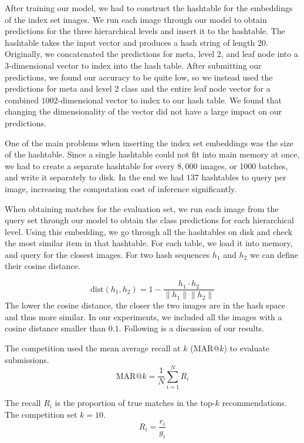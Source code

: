 \documentclass[conference]{IEEEtran}
\begin{document}
After training our model, we had to construct the hashtable for the 
embeddings of the index set images.
We run each image through our model to obtain predictions for the 
three hierarchical levels and insert it to the hashtable.
The hashtable takes the input vector and produces a hash string  of length 20.
Originally, we concatenated the predictions for meta, level 2, and leaf node
into a 3-dimensional vector to index into the hash table.
After submitting our predictions, we found our accuracy to be quite low, so we
instead used the predictions for meta and level 2 class and the entire leaf 
node vector for a combined $1002$-dimensional vector to index to our hash table.
We found that changing the dimensionality of the vector did not have a large
impact on our predictions.


One of the main problems when inserting the index set embeddings was the size of the hashtable.
Since a single hashtable could not fit into main memory at once, 
we had to create a separate hashtable for every $8,000$ images, or 1000 batches, and write 
it separately to disk.
In the end we had $137$ hashtables to query per image, increasing
the computation cost of inference significantly.


When obtaining matches for the evaluation set, we run each image from the query set through 
our model to obtain the class predictions for each hierarchical level.
Using this embedding, we go through all the hashtables on disk and check
the most similar item in that hashtable.
For each table, we load it into memory, and query for the closest images.
For two hash sequences $h_1$ and $h_2$ we can define their cosine distance.

\begin{equation}
	\textrm{dist}(h_1, h_2) = 1 - \frac{h_1 \cdot h_2}{\|h_1\|\|h_2\|}
	\label{eq:cosinesim}
\end{equation}
The lower the cosine distance, the closer the two images are in the hash space 
and thus more similar.
In our experiments, we included all the images with a cosine distance smaller than $0.1$.
Following is a discussion of our results.

The competition used the mean average recall at $k$ (MAR@$k$) to evaluate submissions.
\begin{equation}
	\textrm{MAR@}k = \frac{1}{N}\sum_{i=1}^{N}R_i
	\label{eq:mar@k}
\end{equation}

The recall $R_i$ is the proportion of true matches in the top-$k$ recommendations.
The competition set $k = 10$.
\begin{equation}
	R_i = \frac{r_i}{g_i}
	\label{eq:recall}
\end{equation}
\end{document}

